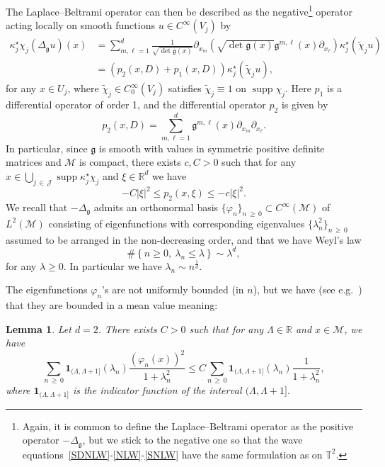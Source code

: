 \documentclass[10pt]{amsart}
\newtheorem{lemm}[theo]{Lemma}\newtheorem{prop}[theo]{Proposition}\newtheorem{coro}[theo]{Corollary}\newtheorem{conj}[theo]{Conjecture}
\theoremstyle{definition}\newtheorem{defi}[theo]{Definition}\newtheorem{rema}[theo]{Remark}\newtheorem{exam}[theo]{Example}\newtheorem{exem}[theo]{Example}\newtheorem{nota}[theo]{Notation}
\newcommand{\R}{\mathbb{R}}
\newcommand{\T}{\mathbb{T}}
\DeclareMathOperator*{\supp}{supp}
\newcommand{\ind}{\mathbf{1}}
\newcommand{\J}{\mathcal{J}}
\newcommand{\M}{\mathcal{M}}
\newcommand{\g}{\mathfrak{g}}
\newcommand{\Ld}{\Lambda}
\newcommand{\Dlg}{\Delta_{\g}}
\newcommand{\kk}{\kappa}
\newcommand{\wt}{\widetilde}
\begin{document}
The Laplace--Beltrami operator can then be described as the negative\footnote{Again, it is common to define the Laplace--Beltrami operator as the positive operator $-\Dlg$, but we stick to the negative one so that the wave equations~\eqref{SDNLW}-\eqref{NLW}-\eqref{SNLW} have the same formulation as on $\T^2$.} operator acting locally on smooth functions $u\in C^{\infty}(V_j)$ by
\begin{align*}
\kk_j^{\star}\chi_j(\Dlg u)(x) &= \sum_{m,\ell=1}^d\frac{1}{\sqrt{\det\g(x)}}\partial_{x_m}\left(\sqrt{\det\g(x)}\g^{m,\ell}(x)\partial_{x_\ell}\right)\kk_j^{\star}\left(\wt\chi_j u\right)\\
&=\left(p_{2}(x,D)+p_{1}(x,D)\right)\kk_j^{\star}\left(\wt\chi_j u\right),
\end{align*}
for any $x\in U_j$, where $\wt\chi_j \in C^{\infty}_0(V_j)$ satisfies $\wt\chi_j\equiv 1$ on $\supp\chi_j$. Here $p_1$ is a differential operator of order 1, and the differential operator $p_{2}$ is given by
\begin{equation}\label{def-psDelta}
p_{2}(x,D)=\sum_{m,\ell=1}^d\g^{m,\ell}(x)\partial_{x_m}\partial_{x_\ell}.
\end{equation}
In particular, since $\g$ is smooth with values in symmetric positive definite matrices and $\M$ is compact, there exists $c,C>0$ such that for any $x\in \bigcup_{j\,\in\,\J}\supp\kk_j^\star \chi_j$ and $\xi\in\R^d$ we have
\begin{equation}\label{bound-p}
-C|\xi|^2\leq p_{2}(x,\xi)\leq -c|\xi|^2.
\end{equation}
We recall that $-\Dlg$ admits an orthonormal basis $\{\varphi_n\}_{n\,\geq\,0}\subset C^{\infty}(\M)$ of $L^2(\M)$ consisting of eigenfunctions with corresponding eigenvalues $\{\lambda_n^2\}_{n\,\geq\,0}$ assumed to be arranged in the non-decreasing order, and that we have Weyl's law
\begin{equation}\label{Weyl}
\#\left\{n\ge 0,~\lambda_n \leq \lambda\right\} \sim \lambda^d,
\end{equation}
for any $\lambda\geq 0$. In particular we have $\lambda_n \sim n^\frac1d$.

The eigenfunctions $\varphi_n$'s are not uniformly bounded (in $n$), but we have (see e.g.~\cite[Proposition~8.3]{BTT1}) that they are bounded in a mean value meaning:

\begin{lemm}\label{LEM:ev}
Let $d=2$. There exists $C>0$ such that for any $\Ld\in\R$ and $x\in\M$, we have
\begin{equation*}
\sum_{n\,\geq\,0}\ind_{(\Ld,\Ld+1]}(\lambda_n)\frac{(\varphi_n(x))^2}{1+\lambda_n^2}\leq C\sum_{n\,\geq\,0}\ind_{(\Ld,\Ld+1]}(\lambda_n)\frac{1}{1+\lambda_n^2},
\end{equation*}
where $\ind_{(\Ld,\Ld+1]}$ is the indicator function of the interval $(\Ld,\Ld+1]$.
\end{lemm}
\end{document}

